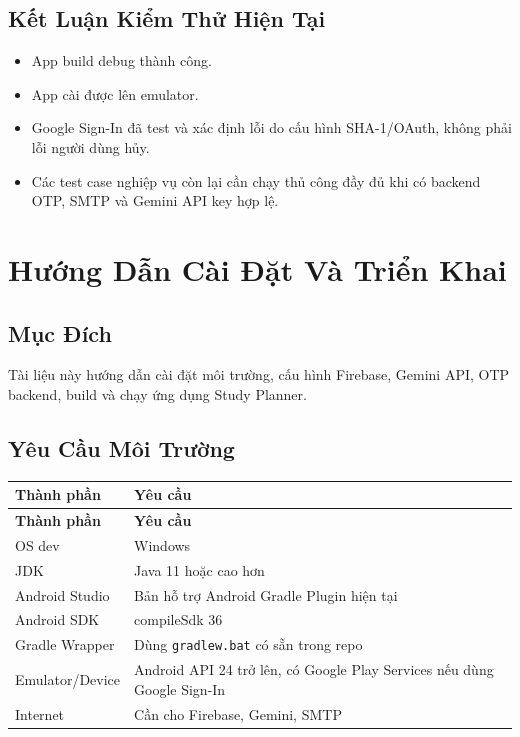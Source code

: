\documentclass[12pt,a4paper]{report}
\begin{document}
\section{Kết Luận Kiểm Thử Hiện Tại}

\begin{itemize}
\item App build debug thành công.
\item App cài được lên emulator.
\item Google Sign-In đã test và xác định lỗi do cấu hình SHA-1/OAuth, không phải lỗi người dùng hủy.
\item Các test case nghiệp vụ còn lại cần chạy thủ công đầy đủ khi có backend OTP, SMTP và Gemini API key hợp lệ.
\end{itemize}
\clearpage
\chapter{Hướng Dẫn Cài Đặt Và Triển Khai}

\section{Mục Đích}

Tài liệu này hướng dẫn cài đặt môi trường, cấu hình Firebase, Gemini API, OTP backend, build và chạy ứng dụng Study Planner.

\section{Yêu Cầu Môi Trường}

\begin{longtable}{|>{\raggedright\arraybackslash}p{}|>{\raggedright\arraybackslash}p{}|}
\hline
\textbf{Thành phần} & \textbf{Yêu cầu} \\ \hline
\endfirsthead
\hline
\textbf{Thành phần} & \textbf{Yêu cầu} \\ \hline
\endhead
OS dev & Windows \\ \hline
JDK & Java 11 hoặc cao hơn \\ \hline
Android Studio & Bản hỗ trợ Android Gradle Plugin hiện tại \\ \hline
Android SDK & compileSdk 36 \\ \hline
Gradle Wrapper & Dùng \texttt{gradlew.bat} có sẵn trong repo \\ \hline
Emulator/Device & Android API 24 trở lên, có Google Play Services nếu dùng Google Sign-In \\ \hline
Internet & Cần cho Firebase, Gemini, SMTP \\ \hline
\end{longtable}
\end{document}
